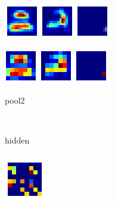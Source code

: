 \begin{frame}[plain]
\begin{figure}
\begin{subfigure}{0.3\textwidth}
\includegraphics[width=\textwidth]{deep_cnn_4_conv}
\end{subfigure}
\hspace{1cm}
\begin{subfigure}{0.3\textwidth}
\includegraphics[width=\textwidth]{deep_cnn_2_pool}
\end{subfigure}
\begin{subfigure}{0.1\textwidth}
\caption*{pool2}
\end{subfigure}
\\
\begin{subfigure}{0.1\textwidth}
\caption*{hidden}
\end{subfigure}
\begin{subfigure}{0.1\textwidth}
\includegraphics[width=\textwidth]{cnn_hidden}

\end{subfigure}
\end{figure}
\end{frame}

